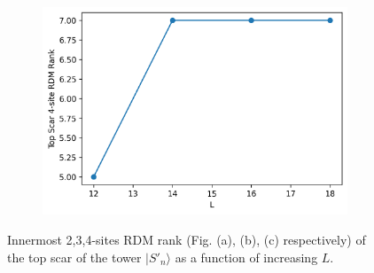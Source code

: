 \documentclass[11pt]{article}
\begin{document}
\begin{itemize}
\begin{itemize}
\begin{figure}[H]
\begin{subfigure}{0.45\textwidth}
        \includegraphics[width=\linewidth]{dw_scar_4p.png}
        \caption{}
        \label{fig:image3p}
    \end{subfigure}

    \caption{Innermost 2,3,4-sites RDM  rank (Fig. (a), (b), (c) respectively) of the top scar of the tower $|S'_n\rangle$ as a function of increasing $L$.}
    \label{fig:dw_scars_towerp}
\end{figure}


\end{itemize}
\end{itemize}


\vspace{0.3cm}
\end{document}
